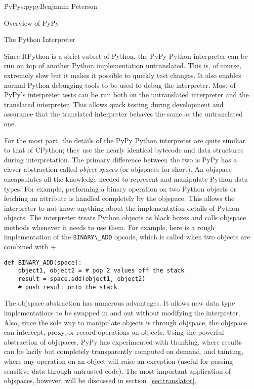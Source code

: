 \begin{aosachapter}{PyPy}{s:pypy}{Benjamin Peterson}
\begin{aosasect1}{Overview of PyPy}
\end{aosasect1}

\begin{aosasect1}{The Python Interpreter}

Since RPython is a strict subset of Python, the PyPy Python interpreter can be
run on top of another Python implementation untranslated. This is, of course,
extremely slow but it makes it possible to quickly test changes. It also enables
normal Python debugging tools to be used to debug the interpreter. Most of
PyPy's interpreter tests can be run both on the untranslated interpreter and the
translated interpreter. This allows quick testing during development and
assurance that the translated interpreter behaves the same as the untranslated
one.

For the most part, the details of the PyPy Python interpreter are quite similiar
to that of CPython; they use the nearly identical bytecode and data structures
during interpretation. The primary difference between the two is PyPy has a
clever abstraction called \emph{object spaces} (or objspaces for short). An
objspace encapsulates all the knowledge needed to represent and manipulate
Python data types. For example, performing a binary operation on two Python
objects or fetching an attribute is handled completely by the objspace. This
allows the interpreter to not know anything about the implementation details of
Python objects. The interpreter treats Python objects as black boxes and calls
objspace methods whenever it needs to use them. For example, here is a rough
implementation of the \verb+BINARY\_ADD+ opcode, which is called when two
objects are combined with +

\begin{verbatim}
def BINARY_ADD(space):
    object1, object2 = # pop 2 values off the stack
    result = space.add(object1, object2)
    # push result onto the stack
\end{verbatim}

The objspace abstraction has numerous advantages. It allows new data type
implementations to be swapped in and out without modifying the
interpreter. Also, since the sole way to manipulate objects is through objspace,
the objspace can intercept, proxy, or record operations on objects. Using the
powerful abstraction of objspaces, PyPy has experimented with thunking, where
results can be lazily but completely transparently computed on demand, and
tainting, where any operation on an object will raise an exception (useful for
passing sensitive data through untrusted code). The most important application
of objspaces, however, will be discussed in section~\ref{sec:translator}.


\end{aosasect1}
\end{aosachapter}
